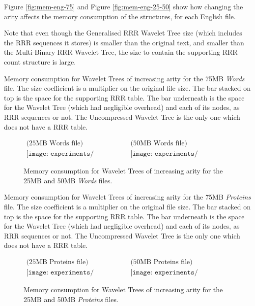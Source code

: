 Figure \ref{fig:mem-eng-75} and Figure \ref{fig:mem-eng-25-50} show how changing 
the arity affects the memory consumption of the structures, for each English 
file.

Note that even though the Generalised RRR Wavelet Tree size (which 
includes the RRR sequences it stores) is smaller than the original text, and 
smaller than the Multi-Binary RRR Wavelet Tree, the size to contain the 
supporting RRR count structure is large.

			{Memory consumption for Wavelet Trees of increasing arity for
			the 75MB \emph{Words} file. The size coefficient is a multiplier
			on the original file size. The bar stacked on top is the space for
			the supporting RRR table. The bar underneath is the space for
			the Wavelet Tree (which had negligible overhead) and each of its
			nodes, as RRR sequences or not. The Uncompressed Wavelet Tree is
			the only one which does not have a RRR table.}
		
			\begin{figure}[h]
			\begin{center}$
			\begin{array}{cc}
			\mbox{(25MB Words file)} & 
			\mbox{(50MB Words file)} \\
			\texttt{[image: experiments/mem\_english\_ints\_25MB]} &
			\texttt{[image: experiments/mem\_english\_ints\_50MB]}
			\end{array}$
			\end{center}
			\caption{Memory consumption for Wavelet Trees of increasing arity 
			for the 25MB and 50MB \emph{Words} files.}
			\label{fig:time-words-25-50}
			\end{figure}

			{Memory consumption for Wavelet Trees of increasing arity for
			the 75MB \emph{Proteins} file. The size coefficient is a multiplier
			on the original file size. The bar stacked on top is the space for
			the supporting RRR table. The bar underneath is the space for
			the Wavelet Tree (which had negligible overhead) and each of its
			nodes, as RRR sequences or not. The Uncompressed Wavelet Tree is
			the only one which does not have a RRR table.}

		\begin{figure}[h]
		\begin{center}$
		\begin{array}{cc}
		\mbox{(25MB Proteins file)} & 
		\mbox{(50MB Proteins file)} \\
		\texttt{[image: experiments/mem\_proteins\_25MB]} &
		\texttt{[image: experiments/mem\_proteins\_50MB]}
		\end{array}$
		\end{center}
		\caption{Memory consumption for Wavelet Trees of increasing arity 
		for the 25MB and 50MB \emph{Proteins} files.}
		\label{fig:mem-prot-25-50}
		\end{figure}
		
